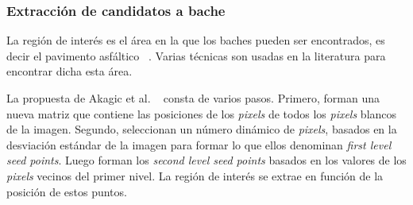 
		\subsubsection{Extracción de candidatos a bache}
		La región de interés es el área en la que los baches pueden ser encontrados, es decir el pavimento asfáltico ~.
		Varias técnicas son usadas en la literatura para encontrar dicha esta área. 

		La propuesta de Akagic et al. ~ consta de varios pasos. Primero, forman una nueva matriz que contiene las posiciones 
		de los \emph{pixels} de todos los \emph{pixels} blancos de la imagen. Segundo, seleccionan un número dinámico de \emph{pixels}, basados 
		en la desviación estándar de la imagen para formar lo que ellos denominan \emph{first level seed points}. Luego forman  los 
		\emph{second level seed points} basados en los valores de los \emph{pixels} vecinos del primer nivel. La región de
		interés se extrae en función de la posición de estos puntos.
		
		

